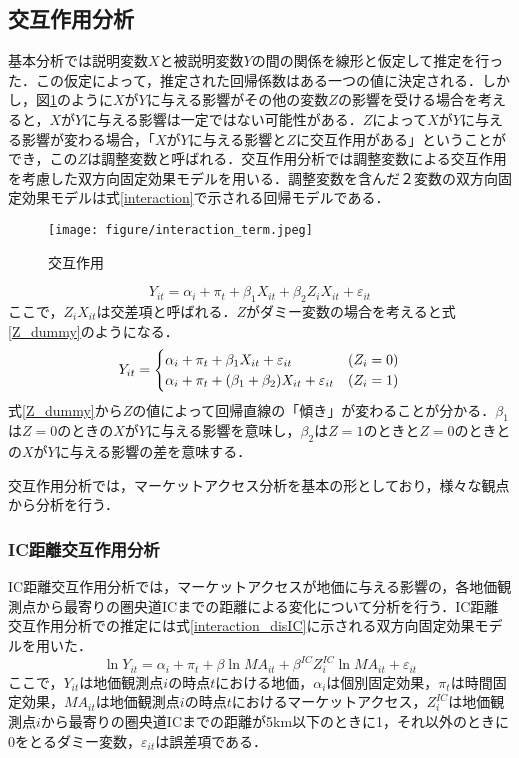 \subsection{交互作用分析}
基本分析では説明変数$X$と被説明変数$Y$の間の関係を線形と仮定して推定を行った．この仮定によって，推定された回帰係数はある一つの値に決定される．しかし，図\ref{interaction_term}のように$X$が$Y$に与える影響がその他の変数$Z$の影響を受ける場合を考えると，$X$が$Y$に与える影響は一定ではない可能性がある．$Z$によって$X$が$Y$に与える影響が変わる場合，「$X$が$Y$に与える影響と$Z$に交互作用がある」ということができ，この$Z$は調整変数と呼ばれる．交互作用分析では調整変数による交互作用を考慮した双方向固定効果モデルを用いる．調整変数を含んだ２変数の双方向固定効果モデルは式\ref{interaction}で示される回帰モデルである．
\begin{figure}[H]
  \centering
  \texttt{[image: figure/interaction\_term.jpeg]}
  \caption{交互作用}
  \label{interaction_term}
\end{figure}
\begin{equation}
  Y_{it} = \alpha_{i} + \pi_{t} + \beta_{1}X_{it} + \beta_{2}Z_{i}X_{it} + \varepsilon_{it}
  \label{interaction}
\end{equation}
ここで，$Z_{i}X_{it}$は交差項と呼ばれる．$Z$がダミー変数の場合を考えると式\ref{Z_dummy}のようになる．
\begin{equation}
  Y_{it} =
  \begin{cases}
    \alpha_{i} + \pi_{t} + \beta_{1}X_{it}  + \varepsilon_{it} & \text (Z_{i} = 0) \\
    \alpha_{i} + \pi_{t} + (\beta_{1}+\beta_{2})X_{it} + \varepsilon_{it} & \text (Z_{i} = 1)
  \end{cases}
  \label{Z_dummy}
\end{equation}
式\ref{Z_dummy}から$Z$の値によって回帰直線の「傾き」が変わることが分かる．$\beta_{1}$は$Z=0$のときの$X$が$Y$に与える影響を意味し，$\beta_{2}$は$Z=1$のときと$Z=0$のときとの$X$が$Y$に与える影響の差を意味する．

交互作用分析では，マーケットアクセス分析を基本の形としており，様々な観点から分析を行う．
\subsubsection{IC距離交互作用分析}
IC距離交互作用分析では，マーケットアクセスが地価に与える影響の，各地価観測点から最寄りの圏央道ICまでの距離による変化について分析を行う．IC距離交互作用分析での推定には式\ref{interaction_disIC}に示される双方向固定効果モデルを用いた．
\begin{equation}
  \ln{Y_{it}} = \alpha_{i} + \pi_{t} + \beta\ln{MA_{it}} + \beta^{IC}Z^{IC}_{i}\ln{MA_{it}} + \varepsilon_{it}
  \label{interaction_disIC}
\end{equation}
ここで，$Y_{it}$は地価観測点$i$の時点$t$における地価，$\alpha_{i}$は個別固定効果，$\pi_{t}$は時間固定効果，$MA_{it}$は地価観測点$i$の時点$t$におけるマーケットアクセス，$Z^{IC}_{i}$は地価観測点$i$から最寄りの圏央道ICまでの距離が5km以下のときに1，それ以外のときに0をとるダミー変数，$\varepsilon_{it}$は誤差項である．

